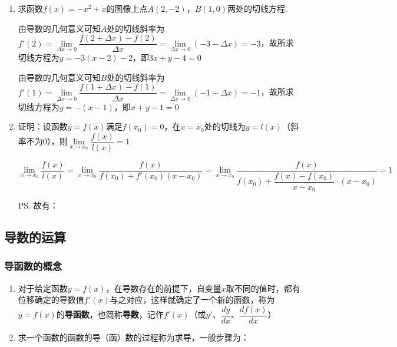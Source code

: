 \begin{enumerate}
    \item 求函数$f(x) = -x^2+x$的图像上点$A(2, -2)$，$B(1, 0)$两处的切线方程.
    \begin{jieda}
        由导数的几何意义可知$A$处的切线斜率为$f'(2) = \lim\limits_{\Delta x \to 0}\dfrac{f(2+\Delta x)-f(2)}{\Delta x} = \lim\limits_{\Delta x \to 0}(-3-\Delta x) = -3$，故所求切线方程为$y = -3(x-2)-2$，即$3x+y-4=0$

        由导数的几何意义可知$B$处的切线斜率为$f'(1) = \lim\limits_{\Delta x \to 0}\dfrac{f(1+\Delta x)-f(1)}{\Delta x} = \lim\limits_{\Delta x \to 0}(-1-\Delta x) = -1$，故所求切线方程为$y = -(x-1)$，即$x+y-1=0$
    \end{jieda}
    \item 证明：设函数$y=f(x)$满足$f(x_0) = 0$，在$x = x_0$处的切线为$y=l(x)$（斜率不为0），则$\lim\limits_{x \to x_0}\dfrac{f(x)}{l(x)} = 1$
    \begin{jieda}
        $\lim\limits_{x \to x_0}\dfrac{f(x)}{l(x)} = \lim\limits_{x \to x_0}\dfrac{f(x)}{f(x_0)+f'(x_0)(x-x_0)} = \lim\limits_{x \to x_0}\dfrac{f(x)}{f(x_0)+\dfrac{f(x)-f(x_0)}{x-x_0} \cdot (x-x_0)} = 1$
        
        \ps 故有：
    \end{jieda}
\end{enumerate}
\subsection*{导数的运算}
\subsubsection*{导函数的概念}
\begin{enumerate}
    \item 对于给定函数$y = f(x)$，在导数存在的前提下，自变量$x$取不同的值时，都有位移确定的导数值$f'(x)$与之对应，这样就确定了一个新的函数，称为$y = f(x)$的\textbf{导函数}，也简称\textbf{导数}，记作$f'(x)$（或$y'$、$\dfrac{dy}{dx}$、$\dfrac{df(x)}{dx}$）
    \item 求一个函数的函数的导（函）数的过程称为求导，一般步骤为：
\end{enumerate}
